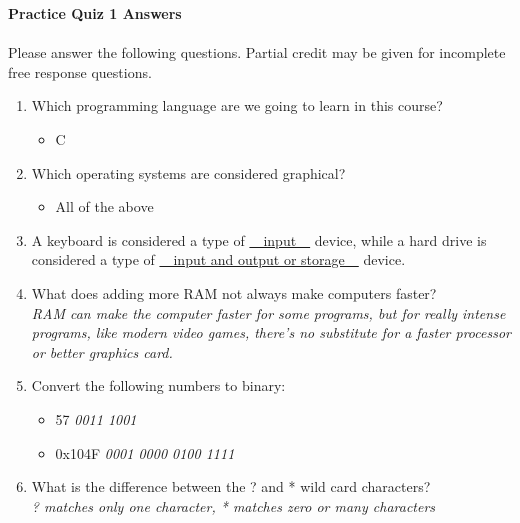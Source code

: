 \documentclass[letter,11pt]{article}
\newcommand*\tick{\item[\Checkmark]}
\newcommand*\fail{\item[\XSolidBrush]}
\begin{document}
\huge
\textbf{Practice Quiz 1 Answers}
\normalsize

\paragraph{}Please answer the following questions. Partial credit may be given for incomplete free response questions.

\begin{enumerate}
    \item Which programming language are we going to learn in this course?
    \begin{itemize}
        \tick C
    \end{itemize}
    
    \item Which operating systems are considered graphical?
    \begin{itemize}
        \tick All of the above
    \end{itemize}
    
    \item A keyboard is considered a type of \underline{~~input~~} device, while a hard drive is considered a type of \underline{~~input and output or storage~~} device.
    
    \item What does adding more RAM not always make computers faster? \\
    \textit{RAM can make the computer faster for some programs, but for really intense programs, like modern video games, there's no substitute for a faster processor or better graphics card.}
    
    \item Convert the following numbers to binary:
    \begin{itemize}
        \item 57 \color{red}\textit{0011 1001} \color{black}{}
        \item 0x104F \color{red}\textit{0001 0000 0100 1111} \color{black}{}
    \end{itemize}
    
    \item What is the difference between the ? and * wild card characters? \\
    \textit{? matches only one character, * matches zero or many characters}
    

\end{enumerate}
\end{document}
